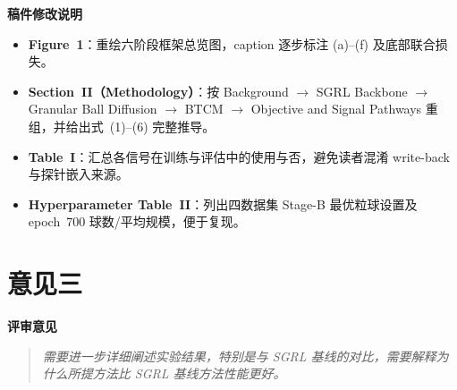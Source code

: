 \documentclass[11pt,a4paper]{ctexart}
\newcommand{\RC}[1]{%
  \par\vspace{0.6em}\noindent\textbf{评审意见}\par
  \begin{quote}\itshape #1\end{quote}}
\newcommand{\MC}[1]{%
  \par\vspace{0.4em}\noindent\textbf{稿件修改说明}\par
  #1\par}
\begin{document}
\MC{%
\begin{itemize}
  \item \textbf{Figure~1}：重绘六阶段框架总览图，caption 逐步标注 (a)--(f) 及底部联合损失。
  \item \textbf{Section~II（Methodology）}：按 Background $\rightarrow$ SGRL Backbone $\rightarrow$ Granular Ball Diffusion $\rightarrow$ BTCM $\rightarrow$ Objective and Signal Pathways 重组，并给出式~(1)--(6) 完整推导。
  \item \textbf{Table~I}：汇总各信号在训练与评估中的使用与否，避免读者混淆 write-back 与探针嵌入来源。
  \item \textbf{Hyperparameter Table~II}：列出四数据集 Stage-B 最优粒球设置及 epoch~700 球数/平均规模，便于复现。
\end{itemize}
}

\section*{意见三}

\RC{需要进一步详细阐述实验结果，特别是与 SGRL 基线的对比，需要解释为什么所提方法比 SGRL 基线方法性能更好。}
\end{document}
